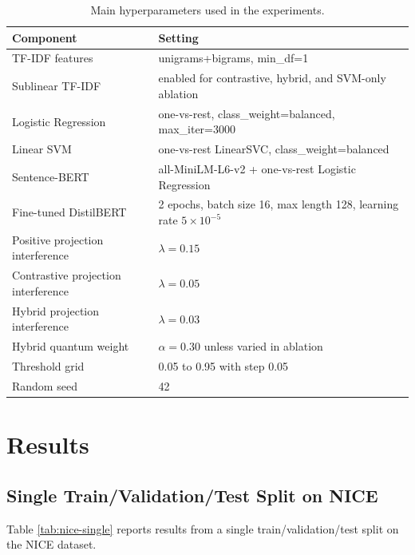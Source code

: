 \documentclass[runningheads]{llncs}
\begin{document}
\begin{table}[htbp]
\centering
\small
\caption{Main hyperparameters used in the experiments.}
\label{tab:hyperparameters}
\setlength{\tabcolsep}{4pt}
\begin{tabularx}{\textwidth}{@{}lX@{}}
\toprule
Component & Setting \\
\midrule
TF-IDF features & unigrams+bigrams, min\_df=1 \\
Sublinear TF-IDF & enabled for contrastive, hybrid, and SVM-only ablation \\
Logistic Regression & one-vs-rest, class\_weight=balanced, max\_iter=3000 \\
Linear SVM & one-vs-rest LinearSVC, class\_weight=balanced \\
Sentence-BERT & all-MiniLM-L6-v2 + one-vs-rest Logistic Regression \\
Fine-tuned DistilBERT & 2 epochs, batch size 16, max length 128, learning rate $5\times10^{-5}$ \\
Positive projection interference & $\lambda=0.15$ \\
Contrastive projection interference & $\lambda=0.05$ \\
Hybrid projection interference & $\lambda=0.03$ \\
Hybrid quantum weight & $\alpha=0.30$ unless varied in ablation \\
Threshold grid & 0.05 to 0.95 with step 0.05 \\
Random seed & 42 \\
\bottomrule
\end{tabularx}
\end{table}

\section{Results}
\subsection{Single Train/Validation/Test Split on NICE}
Table \ref{tab:nice-single} reports results from a single
train/validation/test split on the NICE dataset.
\end{document}
